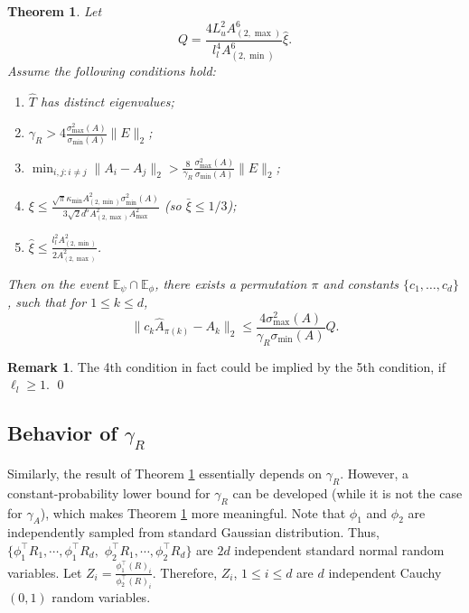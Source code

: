 \documentclass[twoside]{article}
\newcommand{\Epsi}{\mathbb{E}_{\psi}}
\newcommand{\Ephi}{\mathbb{E}_{\phi}}
\newtheorem{thm}[lemma]{Theorem}
\theoremstyle{definition}
\newtheorem{remark}[lemma]{Remark}
\begin{document}
\begin{thm}
\label{thm:Modefficiency}
Let 
 \[ 
 Q=  
 \frac{4L_u^2A^6_{(2,\max)}}{l_l^4 A^6_{(2,\min)}}\widehat{\xi}.
 \] 
 Assume the following conditions hold:
 \begin{enumerate}
 \item $\widehat{T}$ has distinct eigenvalues;
 \item $\gamma_R > 4 \frac{\sigma_{\max}^2(A)}{\sigma_{\min}(A) }\|E\|_2$; 
 \item $\min_{i,j:i\neq j} \|A_i - A_j\|_2 > \frac{8}{\gamma_R}\frac{\sigma_{\max}^2(A)}{\sigma_{\min}(A) } \|E\|_2$;
 \item $\xi \le \frac{\sqrt{\pi}\kappa_{\min}A^2_{(2,\min)}\sigma_{\min}^2(A)}{3\sqrt{2}d^6A_{(2,\max)}^2A_{\max}^2}$
 (so $\bar{\xi} \le 1/3$);
 \item $\widehat{\xi} \le \frac{l_l^2 A^2_{(2,\min)}}{2A^2_{(2,\max)}}$.
 \end{enumerate}
Then on the event $\Epsi \cap\Ephi$, there exists a permutation $\pi$ and constants $\{c_1,\ldots,c_d\}$, such that for $1\le k\le d$,
\[
\| c_k\widehat{A}_{\pi(k)} - A_k\|_2 \le \frac{4\sigma^2_{\max}(A)}{\gamma_R\sigma_{\min}(A)} Q.
\]
\end{thm}
\begin{remark}
The 4th condition in fact could be implied by the 5th condition, if $\ell_l \ge 1$. \qed
\end{remark}

\subsection{Behavior of $\gamma_R$}
\label{subsec:gammaR}
Similarly, the result of Theorem \ref{thm:Modefficiency} essentially depends on $\gamma_R$. 
However, a constant-probability lower bound for $\gamma_R$ can be developed (while it is not the case for $\gamma_A$), which makes Theorem \ref{thm:Modefficiency} more meaningful. 
Note that $\phi_1$ and $\phi_2$ are independently sampled from standard Gaussian distribution. 
Thus, $\{\phi_1^{\top}R_1, \cdots, \phi_1^{\top}R_d,$ $\phi_2^{\top}R_1, \cdots, \phi_2^{\top}R_d\}$ are $2d$ independent standard normal random variables. 
Let $Z_i = \frac{\phi_1^{\top}(R)_i}{\phi_2^{\top}(R)_i}$. Therefore, $Z_i$, $1\le i\le d$ are $d$ independent Cauchy$(0,1)$ random variables. 
\end{document}

